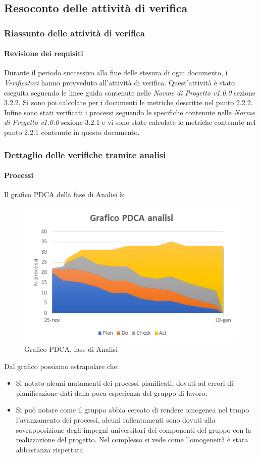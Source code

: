 \subsection{Resoconto delle attività di verifica}
\subsubsection{Riassunto delle attività di verifica}
\paragraph{Revisione dei requisiti} \Spazio
Durante il periodo successivo alla fine delle stesura di ogni documento, i \emph{Verificatori}  hanno provveduto all'attività di verifica. Quest'attività è stato eseguita seguendo le linee guida contenute nelle \emph{Norme di Progetto v1.0.0} sezione 3.2.2.
Si sono poi calcolate per i documenti le metriche descritte nel punto 2.2.2.
Infine sono stati verificati i processi seguendo le specifiche contenute nelle \emph{Norme di Progetto v1.0.0} sezione 3.2.1 e vi sono state calcolate le metriche contenute nel punto 2.2.1 contenute in questo documento.
\subsubsection{Dettaglio delle verifiche tramite analisi}
\paragraph{Processi}
Il grafico PDCA della fase di Analisi è:
\begin{figure} [H]
	\centering
	\includegraphics[scale=1]{Img/Grafico_PDCA}
	\caption{Grafico PDCA, fase di Analisi}\label{}
\end{figure}
Dal grafico possiamo estrapolare che:
\begin{itemize}
	\item Si notato alcuni mutamenti dei processi pianificati, dovuti ad errori di pianificazione dati dalla poca esperienza del gruppo di lavoro;
	\item Si può notare come il gruppo abbia cercato di rendere omogenea nel tempo l'avanzamento dei processi, alcuni rallentamenti sono dovuti alla sovrapposizione degli impegni
	universitari dei componenti del gruppo con la realizzazione del progetto. Nel complesso si vede come l'omogeneità è stata abbastanza rispettata.
\end{itemize}
